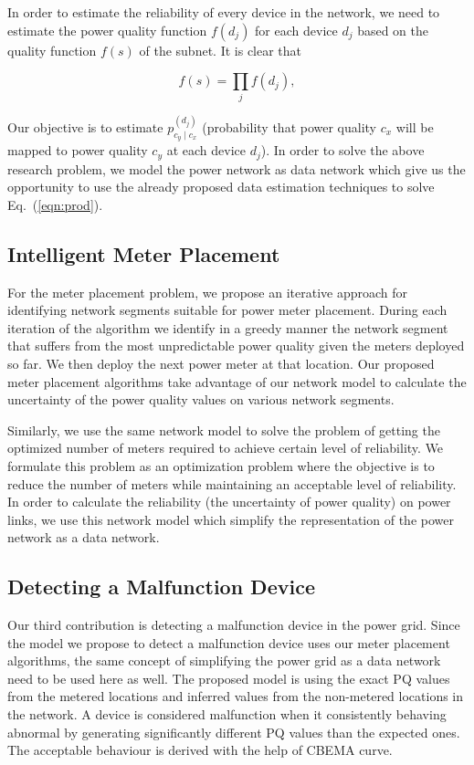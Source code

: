 In order to estimate the reliability of every device in the network, we need to estimate the power quality function $f(d_j)$ for each device $d_j$ based on the quality function $f(s)$ of the subnet. It is clear that

\begin{equation}
\label{eqn:prod}
f(s) = \prod_{j} f(d_j),
\end{equation}

Our objective is to estimate $p_{c_y \mid c_x}^{(d_j)}$ (probability that power quality $c_x$ will be mapped to power quality $c_y$ at each device $d_j$). In order to solve the above research problem, we model the power network as data network which give us the opportunity to use the already proposed data estimation techniques to solve Eq.~(\ref{eqn:prod}).

\subsection{Intelligent Meter Placement}
For the meter placement problem, we propose an iterative approach for identifying network segments suitable for power meter placement. During each iteration of the algorithm we identify in a greedy manner the network segment that suffers from the most unpredictable power quality given the meters deployed so far. We then deploy the next power meter at that location. Our proposed meter placement algorithms take advantage of our network model to calculate the uncertainty of the power quality values on various network segments.

Similarly, we use the same network model to solve the problem of getting the optimized number of meters required to achieve certain level of reliability. We formulate this problem as an optimization problem where the objective is to reduce the number of meters while maintaining an acceptable level of reliability. In order to calculate the reliability (the uncertainty of power quality) on power links, we use this network model which simplify the representation of the power network as a data network.


\subsection{Detecting a Malfunction Device}
Our third contribution is detecting a malfunction device in the power grid. Since the model we propose to detect a malfunction device uses our meter placement algorithms, the same concept of simplifying the power grid as a data network need to be used here as well. The proposed model is using the exact PQ values from the metered locations and inferred values from the non-metered locations in the network. A device is considered malfunction when it consistently behaving abnormal by generating significantly different PQ values than the expected ones. The acceptable behaviour is derived with the help of CBEMA curve.
